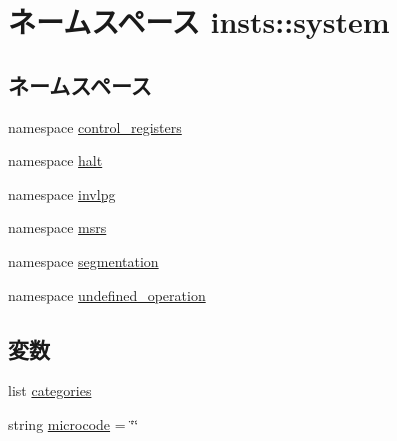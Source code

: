 \hypertarget{namespaceinsts_1_1system}{
\section{ネームスペース insts::system}
\label{namespaceinsts_1_1system}
}
\subsection*{ネームスペース}
\begin{DoxyCompactItemize}
\item 
namespace \hyperlink{namespaceinsts_1_1system_1_1control__registers}{control\_\-registers}
\item 
namespace \hyperlink{namespaceinsts_1_1system_1_1halt}{halt}
\item 
namespace \hyperlink{namespaceinsts_1_1system_1_1invlpg}{invlpg}
\item 
namespace \hyperlink{namespaceinsts_1_1system_1_1msrs}{msrs}
\item 
namespace \hyperlink{namespaceinsts_1_1system_1_1segmentation}{segmentation}
\item 
namespace \hyperlink{namespaceinsts_1_1system_1_1undefined__operation}{undefined\_\-operation}
\end{DoxyCompactItemize}
\subsection*{変数}
\begin{DoxyCompactItemize}
\item 
list \hyperlink{namespaceinsts_1_1system_a273cf0f1630af14c1582f05e53354a55}{categories}
\item 
string \hyperlink{namespaceinsts_1_1system_a770f11a173e99389a8802f0107ed8f52}{microcode} = \char`\"{}\char`\"{}
\end{DoxyCompactItemize}


